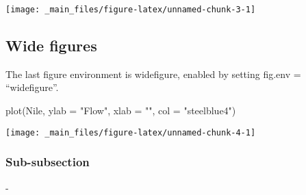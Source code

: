 \documentclass[%
numbers=noendperiod,
parskip=half,
bibliography=totoc,
,
]{scrartcl}
\newenvironment{Shaded}{\begin{snugshade}}{\end{snugshade}}
\newcommand{\AttributeTok}[1]{\textcolor[rgb]{0.77,0.63,0.00}{#1}}
\newcommand{\FunctionTok}[1]{\textcolor[rgb]{0.00,0.00,0.00}{#1}}
\newcommand{\NormalTok}[1]{#1}
\newcommand{\StringTok}[1]{\textcolor[rgb]{0.31,0.60,0.02}{#1}}
\newlength{\overhang}
\newenvironment{fullwidth}{%
  \blockmargin
  \begin{addmargin*}[0em]{-\overhang}%
}{%
  \end{addmargin*}%
  \unblockmargin
}
\begin{document}
\texttt{[image: \_main\_files/figure-latex/unnamed-chunk-3-1]}

\hypertarget{wide-figures}{%
\subsection{Wide figures}\label{wide-figures}}

The last figure environment is widefigure, enabled by setting fig.env = ``widefigure''.

\begin{Shaded}
\begin{Highlighting}[]
\FunctionTok{plot}\NormalTok{(Nile, }\AttributeTok{ylab =} \StringTok{"Flow"}\NormalTok{, }\AttributeTok{xlab =} \StringTok{""}\NormalTok{, }\AttributeTok{col =} \StringTok{"steelblue4"}\NormalTok{)}
\end{Highlighting}
\end{Shaded}

\texttt{[image: \_main\_files/figure-latex/unnamed-chunk-4-1]}

\hypertarget{sub-subsection}{%
\subsubsection{Sub-subsection}\label{sub-subsection}}

\begin{fullwidth}
  \begin{multicols}{2}[\printbibheading]
    \renewcommand{\bibfont}{\small}
    \printbibliography[heading=none]
  \end{multicols}
\end{fullwidth}
\end{document}
